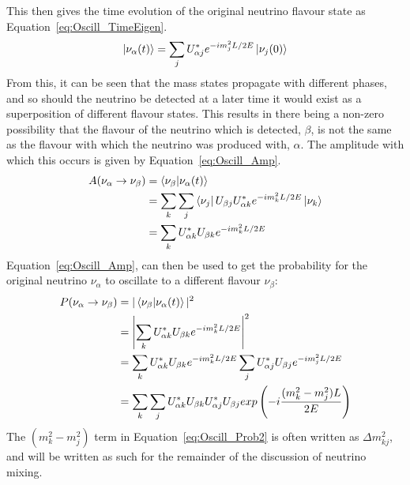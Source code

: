 This then gives the time evolution of the original neutrino flavour state as Equation~\ref{eq:Oscill_TimeEigen}.
\begin{equation}
  \label{eq:Oscill_TimeEigen}
  \ket{\nu_\alpha(t)} = \sum_{j}U^{\ast}_{\alpha j}e^{-im_{j}^{2}L/2E}\ket{\nu_j(0)}
\end{equation}
From this, it can be seen that the mass states propagate with different phases, and so should the neutrino be detected at a later time it would exist as a superposition of different flavour states. This results in there being a non-zero possibility that the flavour of the neutrino which is detected, $\beta$, is not the same as the flavour with which the neutrino was produced with, $\alpha$. The amplitude with which this occurs is given by Equation~\ref{eq:Oscill_Amp}.
\begin{align}
    A(\nu_{\alpha}\rightarrow\nu_{\beta}) &= \bra{\nu_{\beta}}\ket{\nu_\alpha(t)} \nonumber \\
    &= \sum_{k}\sum_{j}\bra{\nu_{j}}U_{\beta j}U^{\ast}_{\alpha k}e^{-im_{k}^{2}L/2E}\ket{\nu_{k}} \nonumber \\
    &= \sum_{k}U^{\ast}_{\alpha k}U_{\beta k}e^{-im_{k}^{2}L/2E}   \label{eq:Oscill_Amp}
\end{align}
Equation~\ref{eq:Oscill_Amp}, can then be used to get the probability for the original neutrino $\nu_{\alpha}$ to oscillate to a different flavour $\nu_{\beta}$:
\begin{align}
  P(\nu_{\alpha}\rightarrow\nu_{\beta}) &= |\bra{\nu_{\beta}}\ket{\nu_\alpha(t)}|^2 \nonumber \\
  &= \left|\sum_{k}U^{\ast}_{\alpha k}U_{\beta k}e^{-im_{k}^{2}L/2E}\right|^2 \label{eq:Oscill_Prob1}\\
  &= \sum_{k}U^{\ast}_{\alpha k}U_{\beta k}e^{-im_{k}^{2}L/2E} \sum_{j}U^{\ast}_{\alpha j}U_{\beta j}e^{-im_{j}^{2}L/2E} \nonumber\\
  &= \sum_{k}\sum_{j}U^{\ast}_{\alpha k}U_{\beta k}U^{\ast}_{\alpha j}U_{\beta j}exp\left(-i\frac{(m^{2}_{k}-m^{2}_{j})L}{2E}\right) \label{eq:Oscill_Prob2}
\end{align}
The $(m^{2}_{k}-m^{2}_{j})$ term in Equation~\ref{eq:Oscill_Prob2} is often written as $\Delta m^{2}_{kj}$, and will be written as such for the remainder of the discussion of neutrino mixing. \\

